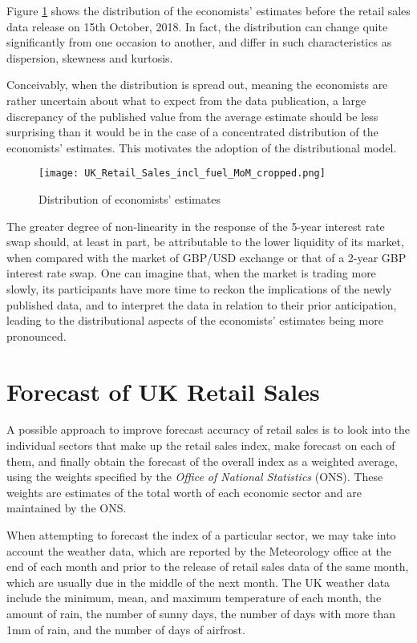 \documentclass[a4paper,11pt,pdftex,twoside,titlepage]{article}
\begin{document}
Figure \ref{fig:u4g56} shows the distribution of the economists'
estimates before the retail sales data release on 15th October, 2018.
In fact, the distribution can change quite significantly from one
occasion to another, and differ in such characteristics as dispersion,
skewness and kurtosis.

Conceivably, when the distribution is spread out, meaning the
economists are rather uncertain about what to expect from the data 
publication, a large discrepancy of the published value from the
average estimate should be less surprising than it would be in the
case of a concentrated distribution of the economists' estimates. This
motivates the adoption of the distributional model.
\begin{figure}[htb!]
  \centering
  \texttt{[image: UK\_Retail\_Sales\_incl\_fuel\_MoM\_cropped.png]}
  \caption{Distribution of economists' estimates}
  \label{fig:u4g56}
\end{figure}

The greater degree of non-linearity in the response of the 5-year
interest rate swap should, at least in part, be attributable to the
lower liquidity of its market, when compared with the market of
GBP/USD exchange or that of a 2-year GBP interest rate swap. One can
imagine that, when the market is trading more slowly, its participants have
more time to reckon the implications of the newly published data, and
to interpret the data in relation to their prior anticipation, leading
to the distributional aspects of the economists' estimates being more
pronounced.

\section{Forecast of UK Retail Sales}
A possible approach to improve forecast accuracy of retail sales is to
look into the individual sectors that make up the retail sales
index, make forecast on each of them, and finally obtain the forecast
of the overall index as a weighted average, using the weights
specified by the {\it Office of National Statistics} (ONS). These
weights are estimates of the total worth of each economic sector and
are maintained by the ONS.

When attempting to forecast the index of a particular sector, we may
take into account the weather data, which are reported by the
Meteorology office at the end of each month and prior to the release
of retail sales data of the same month, which are usually due in the
middle of the next month. The UK weather data include the minimum,
mean, and maximum temperature of each month, the amount of rain,
the number of sunny days, the number of days with more than 1mm of
rain, and the number of days of airfrost.
\end{document}
